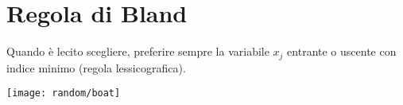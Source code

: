 \documentclass[\main/main.tex]{subfiles}
\begin{document}
\section{Regola di Bland}
\begin{minipage}{\textwidth}
  \begin{minipage}{.83\textwidth}
    \flushleft
    \begin{theorem}
      Quando è lecito scegliere, preferire sempre la variabile $x_j$ entrante o uscente con indice minimo (regola lessicografica).
    \end{theorem}
  \end{minipage}\hfill
  \begin{minipage}{0.15\textwidth}\center
    \texttt{[image: random/boat]}
  \end{minipage}
\end{minipage}
\end{document}
